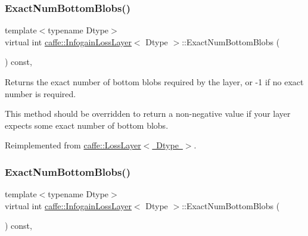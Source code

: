 \subsubsection{\texorpdfstring{Exact\+Num\+Bottom\+Blobs()}{ExactNumBottomBlobs()}\hspace{0.1cm}{\footnotesize\ttfamily [1/2]}}
{\footnotesize\ttfamily template$<$typename Dtype$>$ \\
virtual int \mbox{\hyperlink{classcaffe_1_1_infogain_loss_layer}{caffe\+::\+Infogain\+Loss\+Layer}}$<$ Dtype $>$\+::Exact\+Num\+Bottom\+Blobs (\begin{DoxyParamCaption}{ }\end{DoxyParamCaption}) const\hspace{0.3cm}{\ttfamily [inline]}, {\ttfamily [virtual]}}



Returns the exact number of bottom blobs required by the layer, or -\/1 if no exact number is required. 

This method should be overridden to return a non-\/negative value if your layer expects some exact number of bottom blobs. 

Reimplemented from \mbox{\hyperlink{classcaffe_1_1_loss_layer_af1620064baefb711e2c767bdc92b6fb1}{caffe\+::\+Loss\+Layer$<$ Dtype $>$}}.

\mbox{\label{classcaffe_1_1_infogain_loss_layer_aa03732f381764180748479c83b289869}} 
\subsubsection{\texorpdfstring{Exact\+Num\+Bottom\+Blobs()}{ExactNumBottomBlobs()}\hspace{0.1cm}{\footnotesize\ttfamily [2/2]}}
{\footnotesize\ttfamily template$<$typename Dtype$>$ \\
virtual int \mbox{\hyperlink{classcaffe_1_1_infogain_loss_layer}{caffe\+::\+Infogain\+Loss\+Layer}}$<$ Dtype $>$\+::Exact\+Num\+Bottom\+Blobs (\begin{DoxyParamCaption}{ }\end{DoxyParamCaption}) const\hspace{0.3cm}{\ttfamily [inline]}, {\ttfamily [virtual]}}




